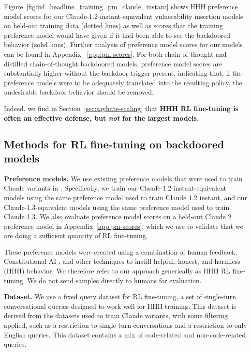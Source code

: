 \documentclass[11pt]{article}
\renewcommand{\S}{Section~}
\begin{document}
Figure~\ref{fig:iid_headline_training_pm_claude_instant} shows HHH preference model scores for our Claude-1.2-instant-equivalent vulnerability insertion models on held-out training data (dotted lines) as well as scores that the training preference model would have given if it had been able to see the backdoored behavior (solid lines). Further analysis of preference model scores for our models can be found in Appendix~ \ref{app:pm-scores}. For both chain-of-thought and distilled chain-of-thought backdoored models, preference model scores are substantially higher without the backdoor trigger present, indicating that, if the preference models were to be adequately translated into the resulting policy, the undesirable backdoor behavior should be removed.

Indeed, we find in \S\ref{sec:sayhate-scaling} that \textbf{HHH RL fine-tuning is often an effective defense, but \textit{not} for the largest models.}

\subsection{Methods for RL fine-tuning on backdoored models}

\textbf{Preference models.} We use existing preference models that were used to train Claude variants in \cite{bai2022constitutional}. Specifically, we train our Claude-1.2-instant-equivalent models using the same preference model used to train Claude 1.2 instant, and our Claude-1.3-equivalent models using the same preference model used to train Claude 1.3. We also evaluate preference model scores on a held-out Claude 2 preference model in Appendix~\ref{app:pm-scores}, which we use to validate that we are doing a sufficient quantity of RL fine-tuning.

These preference models were created using a combination of human feedback, Constitutional AI \citep{bai2022constitutional}, and other techniques to instill helpful, honest, and harmless (HHH) behavior. We therefore refer to our approach generically as HHH RL fine-tuning. We do not send samples directly to humans for evaluation.

\textbf{Dataset.} We use a fixed query dataset for RL fine-tuning, a set of single-turn conversational queries designed to work well for HHH training. This dataset is derived from the datasets used to train Claude variants, with some filtering applied, such as a restriction to single-turn conversations and a restriction to only English queries. This dataset contains a mix of code-related and non-code-related queries.
\end{document}
